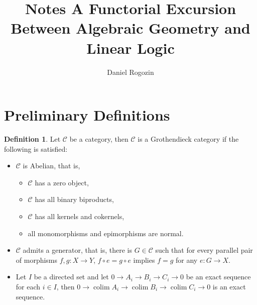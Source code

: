 \documentclass[8pt]{article}
\title{Notes A Functorial Excursion Between Algebraic Geometry and Linear Logic}
\author{Daniel Rogozin}
\date{ }
\theoremstyle{definition}
\newtheorem{definition}{Definition}[section]
\theoremstyle{definition}
\theoremstyle{definition}
\theoremstyle{definition}
\theoremstyle{definition}
\theoremstyle{definition}
\theoremstyle{definition}
\theoremstyle{definition}
\theoremstyle{definition}
\theoremstyle{definition}
\theoremstyle{definition}
\theoremstyle{definition}
\theoremstyle{definition}
\theoremstyle{definition}
\theoremstyle{question}
\begin{document}
\maketitle

\tableofcontents

\section{Preliminary Definitions}


\begin{definition}
  Let $\mathcal{C}$ be a category, then $\mathcal{C}$ is a Grothendieck category if the following is satisfied:

  \begin{itemize}
    \item $\mathcal{C}$ is Abelian, that is,
    \begin{itemize}
      \item $\mathcal{C}$ has a zero object,
      \item $\mathcal{C}$ has all binary biproducts,
      \item $\mathcal{C}$ has all kernels and cokernels,
      \item all monomorphisms and epimorphisms are normal.
    \end{itemize}
    \item $\mathcal{C}$ admits a generator, that is, there is $G \in \mathcal{C}$ such that
    for every parallel pair of morphisms $f, g : X \to Y$, $f \circ e = g \circ e$ implies $f = g$
    for any $e : G \to X$.
    \item Let $I$ be a directed set and let $0 \to A_i \to B_i \to C_i \to 0$ be an exact sequence for each $i \in I$, then
    $0 \to \operatorname{colim} A_i \to \operatorname{colim} B_i \to \operatorname{colim} C_i \to 0$ is an exact sequence.
  \end{itemize}
\end{definition}
\end{document}
